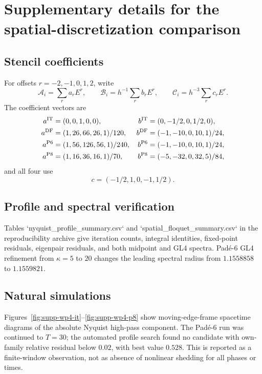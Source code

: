 \section{Supplementary details for the spatial-discretization comparison}
\label{sec:supp-wp4}

\subsection{Stencil coefficients}

For offsets $r=-2,-1,0,1,2$, write
\[
 \mathcal A_i=\sum_r a_rE^r,\qquad
 \mathcal B_i=h^{-1}\sum_r b_rE^r,\qquad
 \mathcal C_i=h^{-3}\sum_r c_rE^r.
\]
The coefficient vectors are
\begin{align*}
 a^{\rm IT}&=(0,0,1,0,0),&
 b^{\rm IT}&=(0,-1/2,0,1/2,0),\\
 a^{\rm DF}&=(1,26,66,26,1)/120,&
 b^{\rm DF}&=(-1,-10,0,10,1)/24,\\
 a^{\rm P6}&=(1,56,126,56,1)/240,&
 b^{\rm P6}&=(-1,-10,0,10,1)/24,\\
 a^{\rm P8}&=(1,16,36,16,1)/70,&
 b^{\rm P8}&=(-5,-32,0,32,5)/84,
\end{align*}
and all four use
\[
 c=(-1/2,1,0,-1,1/2).
\]

\subsection{Profile and spectral verification}

Tables `nyquist_profile_summary.csv` and `spatial_floquet_summary.csv` in the
reproducibility archive give iteration counts, integral identities, fixed-point
residuals, eigenpair residuals, and both midpoint and GL4 spectra.  Pad\'e-6
GL4 refinement from $\kappa=5$ to $20$ changes the leading spectral radius
from $1.1558858$ to $1.1559821$.

\subsection{Natural simulations}

Figures~\ref{fig:supp-wp4-it}--\ref{fig:supp-wp4-p8} show moving-edge-frame
spacetime diagrams of the absolute Nyquist high-pass component.  The Pad\'e-6
run was continued to $T=30$; the automated profile search found no candidate
with own-family relative residual below $0.02$, with best value $0.528$.
This is reported as a finite-window observation, not as absence of nonlinear
shedding for all phases or times.


